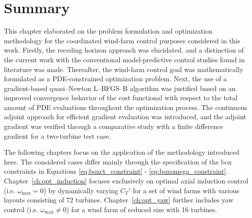 \section{Summary}\label{sec:opt_prob_summ}
This chapter elaborated on the problem formulation and optimization methodology for the coordinated wind-farm control purposes considered in this work. Firstly, the receding horizon approach was elucidated, and a distinction of the current work with the conventional model-predictive control studies found in literature was made. Thereafter, the wind-farm control goal was mathematically formulated as a PDE-constrained optimization problem. Next, the use of a gradient-based quasi--Newton L--BFGS--B algorithm was justified based on an improved convergence behavior of the cost functional with respect to the total amount of PDE evaluations throughout the optimization process. The continuous adjoint approach for efficient gradient evaluation was introduced, and the adjoint gradient was verified through a comparative study with a finite difference gradient for a two-turbine test case. 

The following chapters focus on the application of the methodology introduced here. The considered cases differ mainly through the specification of the box constraints in Equations \eqref{eq:boxct_constraint} - \eqref{eq:boxomega_constraint}. Chapter~\ref{ch:opt_induction} focuses exclusively on optimal axial induction control (i.e. $\omega_{\text{max}} = 0$) by dynamically varying $C_T'$ for a set of wind farms with various layouts consisting of 72 turbines. Chapter~\ref{ch:opt_yaw} further includes yaw control (i.e. $\omega_{\text{max}} \neq 0$) for a wind farm of reduced size with 16 turbines. 


\cleardoublepage
